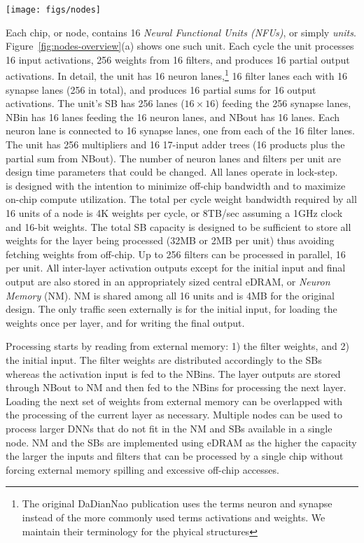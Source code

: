 \begin{figure*}[htb!]
        \centering
        \texttt{[image: figs/nodes]}
   
\caption{Compute Units. \textbf{a)} DaDianNao NFU. \textbf{b)} \ZF unit. From Albericio \textit{et al.}~\cite{cnvlutin}}
\label{fig:nodes-overview}
\end{figure*}

Each \BASE chip, or node, contains 16 \textit{Neural Functional Units (NFUs)}, or simply \textit{units}. Figure~\ref{fig:nodes-overview}(a) shows one such unit. Each cycle the unit processes 16 input activations, 256 weights from 16 filters, and produces 16 partial output activations. In detail, the unit has 16 neuron lanes,\footnote{The original DaDianNao publication uses the terms neuron and synapse instead of the more commonly used terms activations and weights. We maintain their terminology for the phyical structures} 16 filter lanes each with 16 synapse lanes (256 in total), and produces 16 partial sums for 16 output activations. The unit's SB has 256 lanes ($16\times 16$) feeding the 256 synapse lanes, NBin has 16 lanes feeding the 16 neuron lanes, and NBout has 16 lanes. Each neuron lane is connected to 16 synapse lanes, one from each of the 16 filter lanes. The unit has 256 multipliers and 16 17-input adder trees (16 products plus the partial sum from NBout). The number of neuron lanes and filters  per unit are design time parameters that could be changed. All lanes operate in lock-step.\\ \BASE is designed with the intention to minimize off-chip bandwidth and to maximize on-chip compute utilization. The total per cycle weight bandwidth required by all 16 units of a node is 4K weights per cycle, or 8TB/sec assuming a 1GHz clock and 16-bit weights. The total SB capacity is designed to be sufficient to store all weights for the layer being processed (32MB or 2MB per unit) thus avoiding fetching weights from off-chip. Up to 256 filters can be processed in parallel, 16 per unit. All inter-layer activation outputs except for the initial input and final output are also stored in an appropriately sized central eDRAM, or \textit{Neuron Memory} (NM). NM is shared among all 16 units and is 4MB for the original design. The only traffic seen externally is for the initial input, for loading the weights once per layer, and for writing the final output.

Processing starts by reading from external memory: 1) the filter weights, and 2) the initial input. The filter weights are distributed accordingly to the SBs whereas the activation input is fed to the NBins. The layer outputs are stored through NBout to NM and then fed to the NBins for processing the next layer. Loading the next set of weights from external memory can be overlapped with the processing of the current layer as necessary. Multiple nodes can be used to process larger DNNs that do not fit in the NM and SBs available in a single node. NM and the SBs are implemented using eDRAM as the higher the capacity the larger the inputs and filters that can be processed by a single chip without forcing external memory spilling and excessive off-chip accesses.  

